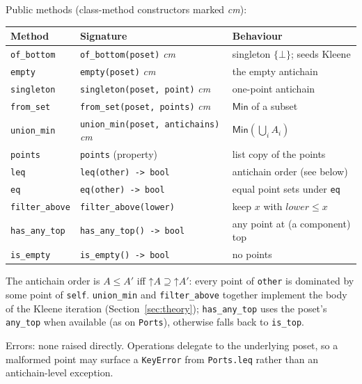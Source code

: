 \documentclass[11pt,a4paper]{article}
\newcommand{\Min}{\mathsf{Min}}
\begin{document}
Public methods (class-method constructors marked \emph{cm}):

\begin{center}
\begin{tabular}{@{}lll@{}}
\toprule
Method & Signature & Behaviour \\
\midrule
\texttt{of\_bottom}   & \texttt{of\_bottom(poset)} \emph{cm}      & singleton $\{\bot\}$; seeds Kleene \\
\texttt{empty}        & \texttt{empty(poset)} \emph{cm}           & the empty antichain \\
\texttt{singleton}    & \texttt{singleton(poset, point)} \emph{cm}& one-point antichain \\
\texttt{from\_set}    & \texttt{from\_set(poset, points)} \emph{cm}& $\Min$ of a subset \\
\texttt{union\_min}   & \texttt{union\_min(poset, antichains)} \emph{cm}& $\Min(\bigcup_i A_i)$ \\
\texttt{points}       & \texttt{points} (property)                & list copy of the points \\
\texttt{leq}          & \texttt{leq(other) -> bool}               & antichain order (see below) \\
\texttt{eq}           & \texttt{eq(other) -> bool}                & equal point sets under \texttt{eq} \\
\texttt{filter\_above}& \texttt{filter\_above(lower)}             & keep $x$ with $lower \leq x$ \\
\texttt{has\_any\_top}& \texttt{has\_any\_top() -> bool}          & any point at (a component) top \\
\texttt{is\_empty}    & \texttt{is\_empty() -> bool}              & no points \\
\bottomrule
\end{tabular}
\end{center}

The antichain order is $A \leq A'$ iff $\mathord{\uparrow} A \supseteq
\mathord{\uparrow} A'$: every point of \texttt{other} is dominated by some
point of \texttt{self}. \texttt{union\_min} and \texttt{filter\_above}
together implement the body of the Kleene iteration (Section~\ref{sec:theory});
\texttt{has\_any\_top} uses the poset's \texttt{any\_top} when available
(as on \texttt{Ports}), otherwise falls back to \texttt{is\_top}.

Errors: none raised directly. Operations delegate to the underlying
poset, so a malformed point may surface a \texttt{KeyError} from
\texttt{Ports.leq} rather than an antichain-level exception.
\end{document}
